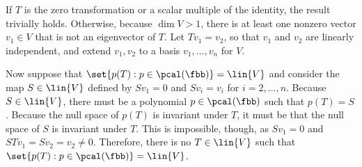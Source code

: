 \begin{sol}
    If $T$ is the zero transformation or a scalar multiple of the identity, the result trivially holds. 
    Otherwise, because $\dim V > 1$, there is at least one nonzero vector $v_1 \in V$ that is not an eigenvector of $T$.
    Let $Tv_1 = v_2$, so that $v_1$ and $v_2$ are linearly independent, and extend $v_1, v_2$ to a basis $v_1, \dots, v_n$ for $V$.

    Now suppose that $\set{p(T) : p \in \pcal(\fbb)} = \lin{V}$ and consider the map $S \in \lin{V}$ defined by $Sv_1 = 0$ and $Sv_i = v_i$ for $i = 2,\dots,n$. Because $S \in \lin{V}$, there must be a polynomial $p \in \pcal(\fbb)$ such that $p(T) = S$.
    Because the null space of $p(T)$ is invariant under $T$, it must be that the null space of $S$ is invariant under $T$. 
    This is impossible, though, as $Sv_1 = 0$ and $STv_1 = Sv_2 = v_2 \neq 0$. 
    Therefore, there is no $T \in \lin{V}$ such that $\set{p(T) : p \in \pcal(\fbb)} = \lin{V}$.
\end{sol}
